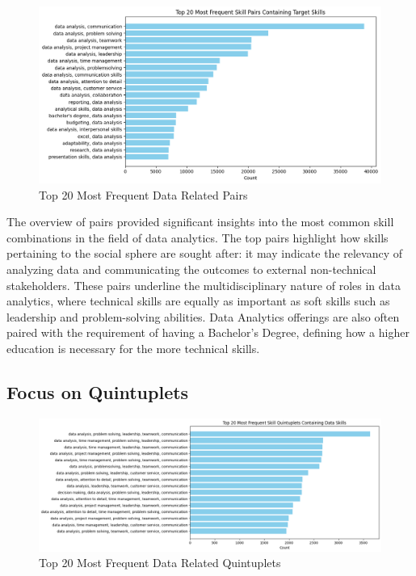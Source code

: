 \documentclass{article}
\begin{document}
\vspace{0.3cm}
\begin{figure}[H]
    \centering
    \includegraphics[width=1\linewidth]{download (36).png}
    \caption{Top 20 Most Frequent Data Related Pairs}
    \label{fig:skill_pairs_1}
\end{figure}


The overview of pairs provided significant insights into the most common skill combinations in the field of data analytics. The top pairs highlight how skills pertaining to the social sphere are sought after: it may indicate the relevancy of analyzing data and communicating the outcomes to external non-technical stakeholders.
These pairs underline the multidisciplinary nature of roles in data analytics, where technical skills are equally as important as soft skills such as leadership and problem-solving abilities. 
Data Analytics offerings are also often paired with the requirement of having a Bachelor's Degree, defining how a higher education is necessary for the more technical skills.



\subsection{Focus on Quintuplets}

\vspace{0.3cm}
\begin{figure}[H]
    \centering
    \includegraphics[width=1\linewidth]{download (37).png}
    \caption{Top 20 Most Frequent Data Related Quintuplets}
    \label{fig:skill_pairs_1}
\end{figure}
\end{document}

